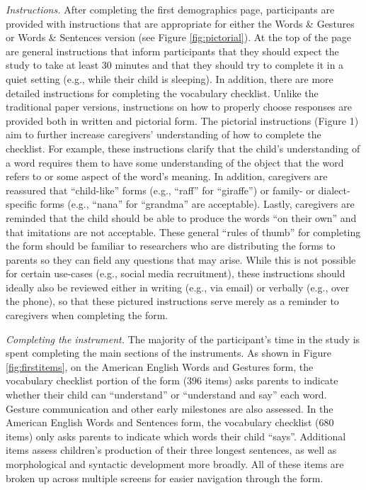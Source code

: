 \documentclass[
  english,
  ,man,floatsintext]{apa6}
\begin{document}
\emph{Instructions.} After completing the first demographics page, participants are provided with instructions that are appropriate for either the Words \& Gestures or Words \& Sentences version (see Figure \ref{fig:pictorial}). At the top of the page are general instructions that inform participants that they should expect the study to take at least 30 minutes and that they should try to complete it in a quiet setting (e.g., while their child is sleeping). In addition, there are more detailed instructions for completing the vocabulary checklist. Unlike the traditional paper versions, instructions on how to properly choose responses are provided both in written and pictorial form. The pictorial instructions (Figure 1) aim to further increase caregivers' understanding of how to complete the checklist. For example, these instructions clarify that the child's understanding of a word requires them to have some understanding of the object that the word refers to or some aspect of the word's meaning. In addition, caregivers are reassured that \enquote{child-like} forms (e.g., \enquote{raff} for \enquote{giraffe}) or family- or dialect-specific forms (e.g., \enquote{nana} for \enquote{grandma} are acceptable). Lastly, caregivers are reminded that the child should be able to produce the words \enquote{on their own} and that imitations are not acceptable. These general \enquote{rules of thumb} for completing the form should be familiar to researchers who are distributing the forms to parents so they can field any questions that may arise. While this is not possible for certain use-cases (e.g., social media recruitment), these instructions should ideally also be reviewed either in writing (e.g., via email) or verbally (e.g., over the phone), so that these pictured instructions serve merely as a reminder to caregivers when completing the form.

\emph{Completing the instrument.} The majority of the participant's time in the study is spent completing the main sections of the instruments. As shown in Figure \ref{fig:firstitems}, on the American English Words and Gestures form, the vocabulary checklist portion of the form (396 items) asks parents to indicate whether their child can \enquote{understand} or \enquote{understand and say} each word. Gesture communication and other early milestones are also assessed. In the American English Words and Sentences form, the vocabulary checklist (680 items) only asks parents to indicate which words their child \enquote{says}. Additional items assess children's production of their three longest sentences, as well as morphological and syntactic development more broadly. All of these items are broken up across multiple screens for easier navigation through the form.
\end{document}
